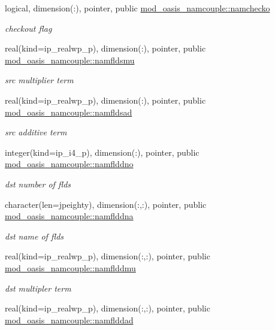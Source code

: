 \begin{DoxyCompactItemize}
logical, dimension(\+:), pointer, public \hyperlink{namespacemod__oasis__namcouple_a58c011820e55c9af9f306fbb1d45eb23}{mod\+\_\+oasis\+\_\+namcouple\+::namchecko}
\begin{DoxyCompactList}\small\item\em checkout flag \end{DoxyCompactList}\item 
real(kind=ip\+\_\+realwp\+\_\+p), dimension(\+:), pointer, public \hyperlink{namespacemod__oasis__namcouple_ab52824ec91491253e02556a68ab31b09}{mod\+\_\+oasis\+\_\+namcouple\+::namfldsmu}
\begin{DoxyCompactList}\small\item\em src multiplier term \end{DoxyCompactList}\item 
real(kind=ip\+\_\+realwp\+\_\+p), dimension(\+:), pointer, public \hyperlink{namespacemod__oasis__namcouple_a1729dba99742412a1e07a479cb7f7921}{mod\+\_\+oasis\+\_\+namcouple\+::namfldsad}
\begin{DoxyCompactList}\small\item\em src additive term \end{DoxyCompactList}\item 
integer(kind=ip\+\_\+i4\+\_\+p), dimension(\+:), pointer, public \hyperlink{namespacemod__oasis__namcouple_a0bc8fb08bfa426cc3da584e401b45328}{mod\+\_\+oasis\+\_\+namcouple\+::namflddno}
\begin{DoxyCompactList}\small\item\em dst number of flds \end{DoxyCompactList}\item 
character(len=jpeighty), dimension(\+:,\+:), pointer, public \hyperlink{namespacemod__oasis__namcouple_af064ea6bf295846a3f2f8a8b3ab66a66}{mod\+\_\+oasis\+\_\+namcouple\+::namflddna}
\begin{DoxyCompactList}\small\item\em dst name of flds \end{DoxyCompactList}\item 
real(kind=ip\+\_\+realwp\+\_\+p), dimension(\+:,\+:), pointer, public \hyperlink{namespacemod__oasis__namcouple_adff0b79053f9cad9717a5ce3c09136e6}{mod\+\_\+oasis\+\_\+namcouple\+::namflddmu}
\begin{DoxyCompactList}\small\item\em dst multipler term \end{DoxyCompactList}\item 
real(kind=ip\+\_\+realwp\+\_\+p), dimension(\+:,\+:), pointer, public \hyperlink{namespacemod__oasis__namcouple_a6500fb8d6da6ed3cf4ec148f38efa704}{mod\+\_\+oasis\+\_\+namcouple\+::namflddad}

\end{DoxyCompactItemize}
